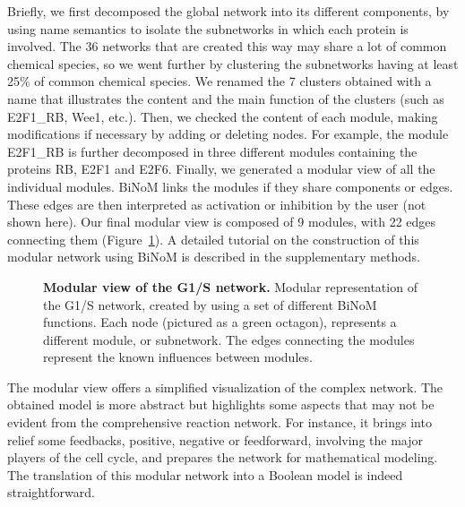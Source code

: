 \documentclass[10pt]{bmc_article}
\newenvironment{bmcformat}{\baselineskip20pt\sloppy\setboolean{publ}{false}}{\baselineskip20pt\sloppy}
\begin{document}
\begin{bmcformat}
Briefly, we first decomposed the global network into its different components,
by using name semantics to isolate the subnetworks in which
each protein is involved. The 36 networks that are created this way may share a
lot of common chemical species, so we went further
by clustering the subnetworks having at least 25\% of common chemical species. We renamed
the 7 clusters obtained with a name that illustrates the content and the main
function of the clusters (such as E2F1\_RB, Wee1, etc.). Then, we checked the
content of each module, making modifications if necessary by adding or deleting nodes.
For example, the module E2F1\_RB is
further decomposed in three different modules containing the proteins RB, E2F1
and E2F6. Finally, we generated a modular view of all the individual modules.
BiNoM links the modules if they share components or edges. These edges are then
interpreted as activation or inhibition by the user (not shown here). Our final
modular view is composed of 9 modules, with 22
edges connecting them (Figure~\ref{g1smodular}). A detailed tutorial on the
construction of this modular network using BiNoM is described in the
supplementary methods.


\begin{figure}[h]
 \caption{\label{g1smodular}  \textbf{Modular view of the G1/S network.}
	Modular representation of the G1/S network, created by using a set of
different BiNoM functions. Each node (pictured as a green octagon), represents a
different module, or subnetwork. The edges connecting the modules represent the
 known influences between modules. }
\end{figure}

The modular view offers a simplified visualization of the complex network. The
obtained model is more abstract but highlights some aspects that may not be
evident from the comprehensive reaction network. For instance, it brings into relief some
feedbacks, positive, negative or feedforward, involving the major players of the
cell cycle, and prepares the network for mathematical modeling. The translation
of this modular network into a Boolean model is indeed straightforward.


\end{bmcformat}
\end{document}
